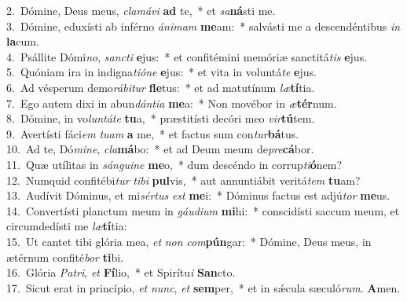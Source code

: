 {2.~}Dómine, Deus meus, \textit{cla}\textit{má}\textit{vi} \textbf{ad} te,~* et \textit{sa}\textbf{ná}sti me.\\
{3.~}Dómine, eduxísti ab inférno \textit{á}\textit{ni}\textit{mam} \textbf{me}am:~* salvásti me a descendéntibus \textit{in} \textbf{la}cum.\\
{4.~}Psállite Dómi\textit{no}, \textit{san}\textit{cti} \textbf{e}jus:~* et confitémini memóriæ sanctitá\textit{tis} \textbf{e}jus.\\
{5.~}Quóniam ira in indigna\textit{ti}\textit{ó}\textit{ne} \textbf{e}jus:~* et vita in voluntá\textit{te} \textbf{e}jus.\\
{6.~}Ad vésperum demo\textit{rá}\textit{bi}\textit{tur} \textbf{fle}tus:~* et ad matutínum \textit{læ}\textbf{tí}tia.\\
{7.~}Ego autem dixi in abun\textit{dán}\textit{ti}\textit{a} \textbf{me}a:~* Non movébor in \textit{æ}\textbf{tér}num.\\
{8.~}Dómine, in vo\textit{lun}\textit{tá}\textit{te} \textbf{tu}a,~* præstitísti decóri meo \textit{vir}\textbf{tú}tem.\\
{9.~}Avertísti fáci\textit{em} \textit{tu}\textit{am} \textbf{a} me,~* et factus sum con\textit{tur}\textbf{bá}tus.\\
{10.~}Ad te, Dó\textit{mi}\textit{ne}, \textit{cla}\textbf{má}bo:~* et ad Deum meum de\textit{pre}\textbf{cá}bor.\\
{11.~}Quæ utílitas in \textit{sán}\textit{gui}\textit{ne} \textbf{me}o,~* dum descéndo in corrup\textit{ti}\textbf{ó}nem?\\
{12.~}Numquid confitébi\textit{tur} \textit{ti}\textit{bi} \textbf{pul}vis,~* aut annuntiábit veritá\textit{tem} \textbf{tu}am?\\
{13.~}Audívit Dóminus, et mi\textit{sér}\textit{tus} \textit{est} \textbf{me}i:~* Dóminus factus est adjú\textit{tor} \textbf{me}us.\\
{14.~}Convertísti planctum meum in \textit{gáu}\textit{di}\textit{um} \textbf{mi}hi:~* conscidísti saccum meum, et circumdedísti me \textit{læ}\textbf{tí}tia:\\
{15.~}Ut cantet tibi glória mea, \textit{et} \textit{non} \textit{com}\textbf{pún}gar:~* Dómine, Deus meus, in ætérnum confité\textit{bor} \textbf{ti}bi.\\
{16.~}Glória \textit{Pa}\textit{tri}, \textit{et} \textbf{Fí}lio,~* et Spirítu\textit{i} \textbf{San}cto.\\
{17.~}Sicut erat in princípio, \textit{et} \textit{nunc}, \textit{et} \textbf{sem}per,~* et in sǽcula sæculó\textit{rum}. \textbf{A}men.\\
